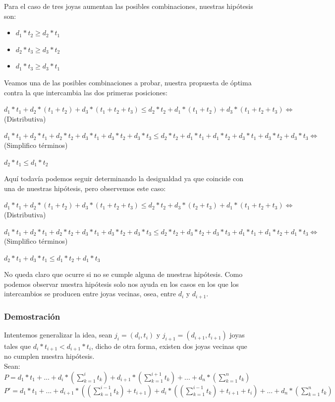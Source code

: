 Para el caso de tres joyas aumentan las posibles combinaciones, nuestras hip\'otesis son:

\begin{itemize}
\item $d_1*t_2 \geq d_2*t_1$
\item $d_2*t_3 \geq d_3*t_2$
\item $d_1*t_3 \geq d_3*t_1$
\end{itemize}

Veamos una de las posibles combinaciones a probar, nuestra propuesta de \'optima contra la que intercambia las dos primeras posiciones:

$d_1*t_1 + d_2*(t_1 + t_2) + d_3*(t_1+t_2+t_3) \leq d_2*t_2 + d_1*(t_1 + t_2) + d_3*(t_1+t_2+t_3) \Longleftrightarrow$ (Distributiva)

$d_1*t_1 + d_2*t_1 + d_2*t_2 + d_3*t_1+d_3*t_2+d_3*t_3 \leq d_2*t_2 + d_1*t_1 + d_1*t_2 + d_3*t_1+d_3*t_2+d_3*t_3 \Longleftrightarrow$ (Simplifico t\'erminos)

$d_2*t_1 \leq d_1*t_2$

Aqu\'i todav\'ia podemos seguir determinando la desigualdad ya que coincide con una de nuestras hip\'otesis, pero observemos este caso:

$d_1*t_1 + d_2*(t_1 + t_2) + d_3*(t_1+t_2+t_3) \leq d_2*t_2 + d_3*(t_2 + t_3) + d_1*(t_1+t_2+t_3) \Longleftrightarrow$ (Distributiva)

$d_1*t_1 + d_2*t_1 + d_2*t_2 + d_3*t_1+d_3*t_2+d_3*t_3 \leq d_2*t_2 + d_3*t_2 + d_3*t_3 + d_1*t_1+d_1*t_2+d_1*t_3 \Longleftrightarrow$ (Simplifico t\'erminos)

$d_2*t_1 + d_3*t_1 \leq d_1*t_2 + d_1*t_3$

No queda claro que ocurre si no se cumple alguna de nuestras hip\'otesis. Como podemos observar nuestra hip\'otesis solo nos ayuda en los casos en los que los intercambios se producen entre joyas vecinas, osea, entre $d_i$ y $d_{i+1}$. \\

\subsubsection*{Demostraci\'on}

Intentemos generalizar la idea, sean $j_i = (d_i, t_i)$ y $j_{i+1} = (d_{i+1}, t_{i+1})$ joyas tales que $d_i*t_{i+1} < d_{i+1}*t_i$, dicho de otra forma, existen dos joyas vecinas que no cumplen nuestra hip\'otesis. \\

Sean: \\
$P = d_1*t_1 + ... + d_i*(\sum\limits_{k=1}^i t_k) + d_{i+1}*(\sum\limits_{k=1}^{i+1} t_k) + ... + d_n*(\sum\limits_{k=1}^n t_k)$ \\
$P' = d_1*t_1 + ... + d_{i+1}*((\sum\limits_{k=1}^{i-1} t_k) + t_{i+1}) + d_i*((\sum\limits_{k=1}^{i-1} t_k) + t_{i+1} + t_i) + ... + d_n*(\sum\limits_{k=1}^n t_k)$

